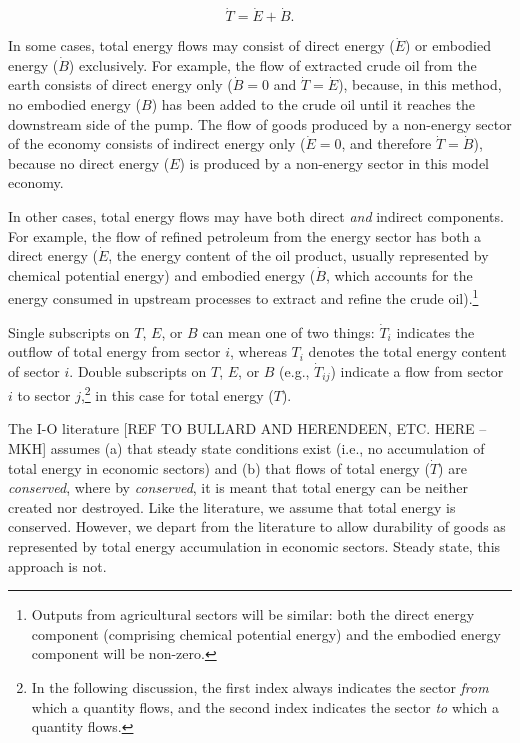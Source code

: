 \documentclass[authoryear,preprint,review,12pt]{elsarticle}
\begin{document}
\begin{equation} \label{eq:T_dot_def}
	\dot{T} = \dot{E} + \dot{B}.
\end{equation}

In some cases, total energy flows may consist of direct energy ($\dot{E}$) or embodied energy ($\dot{B}$) exclusively. For example, the flow of extracted crude oil from the earth consists of direct energy only ($\dot{B} = 0$ and $\dot{T} = \dot{E}$), because, in this method, no embodied energy ($B$) has been added to the crude oil until it reaches the downstream side of the pump. The flow of goods produced by a non-energy sector of the economy consists of indirect energy only ($\dot{E} = 0$, and therefore $\dot{T} = \dot{B}$), because no direct energy ($E$) is produced by a non-energy sector in this model economy. 

In other cases, total energy flows may have both direct \emph{and} indirect components. For example, the flow of refined petroleum from the energy sector has both a direct energy ($\dot{E}$, the energy content of the oil product, usually represented by chemical potential energy) and embodied energy ($\dot{B}$, which accounts for the energy consumed in upstream processes to extract and refine the crude oil).\footnote{Outputs from agricultural sectors will be similar: both the direct energy component (comprising chemical potential energy) and the embodied energy component will be non-zero.}

Single subscripts on $T$, $E$, or $B$ can mean one of two things: $\dot{T}_{i}$ indicates the outflow of total energy from sector $i$, whereas $T_{i}$ denotes the total energy content of sector $i$. Double subscripts on $T$, $E$, or $B$ (e.g., $\dot{T}_{ij}$) indicate a flow from sector $i$ to sector $j$,\footnote{In the following discussion, the first index always indicates the sector \emph{from} which a quantity flows, and the second index indicates the sector \emph{to} which a quantity flows.} in this case for total energy ($T$).  

The I-O literature \cite{Bullard1975, Herendeen1978} [REF TO BULLARD AND HERENDEEN, ETC. HERE --MKH] assumes (a) that steady state conditions exist (i.e., no accumulation of total energy in economic sectors) and (b) that flows of total energy ($\dot{T}$) are \emph{conserved}, where by \emph{conserved}, it is meant that total energy can be neither created nor destroyed. Like the literature, we assume that total energy is conserved. However, we depart from the literature to allow durability of goods as represented by total energy accumulation in economic sectors. Steady state, this approach is not.
\end{document}
